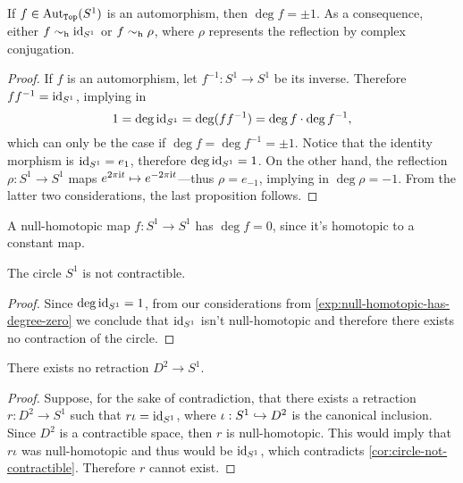 \begin{corollary}[Automorphisms of \(S^1\)]
    \label{cor:automorphism-of-circle-is-reflection-or-identity}
    If \(f \in \operatorname{Aut}_{{\texttt{Top}}}(S^1)\) is an automorphism, then \(\deg f = \pm 1\). As a
    consequence, either \(f \sim_{\text{h}} \operatorname{id}_{S^1}\) or \(f \sim_{\text{h}} \rho\), where \(\rho\)
    represents the reflection by complex conjugation.
\end{corollary}

\begin{proof}
    If \(f\) is an automorphism, let \(f^{-1}: S^1 \to S^1\) be its
    inverse. Therefore \(f f^{-1} = \operatorname{id}_{S^1}\), implying in
    \[
        1 = \deg \operatorname{id}_{S^1} = \deg(f f^{-1}) = \deg f \cdot \deg f^{-1},
    \]
    which can only be the case if \(\deg f = \deg f^{-1} = \pm 1\). Notice that the
    identity morphism is \(\operatorname{id}_{S^1} = e_1\), therefore \(\deg \operatorname{id}_{S^1} = 1\). On
    the other hand, the reflection \(\rho: S^1 \to S^1\) maps
    \(e^{2 \pi \text{i} t} \mapsto e^{-2 \pi \text{i} t}\)---thus \(\rho = e_{-1}\),
    implying in \(\deg \rho = -1\). From the latter two considerations, the last
    proposition follows.
\end{proof}

\begin{example}
    \label{exp:null-homotopic-has-degree-zero}
    A null-homotopic map \(f: S^1 \to S^1\) has \(\deg f = 0\), since it's homotopic
    to a constant map.
\end{example}

\begin{corollary}
    \label{cor:circle-not-contractible}
    The circle \(S^1\) is not contractible.
\end{corollary}

\begin{proof}
    Since \(\deg \operatorname{id}_{S^1} = 1\), from our considerations from
    \cref{exp:null-homotopic-has-degree-zero} we conclude that \(\operatorname{id}_{S^1}\) isn't
    null-homotopic and therefore there exists no contraction of the circle.
\end{proof}

\begin{corollary}
    \label{cor:no-retraction-from-disk-to-circle}
    There exists no retraction \(D^2 \to S^1\).
\end{corollary}

\begin{proof}
    Suppose, for the sake of contradiction, that there exists a retraction \(r: D^2
    \to S^1\) such that \(r \iota = \operatorname{id}_{S^1}\), where \(\iota: S^1 \hookrightarrow D^2\) is
    the canonical inclusion. Since \(D^2\) is a contractible space, then \(r\) is
    null-homotopic. This would imply that \(r \iota\) was null-homotopic and thus
    would be \(\operatorname{id}_{S^1}\), which contradicts
    \cref{cor:circle-not-contractible}. Therefore \(r\) cannot exist.
\end{proof}

